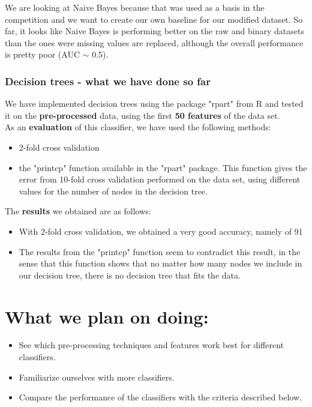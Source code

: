 \documentclass[a4paper,11pt]{article}
\begin{document}
We are looking at Naive Bayes because that was used as a basis in the competition and we want to create our own baseline for our modified dataset. So far, it looks like Naive Bayes is performing better on the raw and binary datasets than the ones were missing values are replaced, although the overall performance is pretty poor (AUC $\sim$ 0.5).


\subsubsection*{Decision trees - what we have done so far}
	We have implemented decision trees using the package "rpart" from R and tested it on the \textbf{pre-processed} data, using the first \textbf{50 features} of the data set. \\
	As an \textbf{evaluation} of this classifier, we have used the following methods:
	\begin{itemize}
		\item 2-fold cross validation
		\item the "printcp" function available in the "rpart" package. This function gives the error from 10-fold cross validation performed on the data set, using different values for the number of nodes in the decision tree. 
	\end{itemize}
	The \textbf{results} we obtained are as follows:
	\begin{itemize}
		\item With 2-fold cross validation, we obtained a very good accuracy, namely of 91%
		\item The results from the "printcp" function seem to contradict this result, in the sense that this function shows that no matter how many nodes we include in our decision tree, there is no decision tree that fits the data.
	\end{itemize}
	
	
	
	

\section*{What we plan on doing:}
\begin{itemize}
	\item See which pre-processing techniques and features work best for different classifiers.
	\item Familiarize ourselves with more classifiers.
	\item Compare the performance of the classifiers with the criteria described below.
\end{itemize}
\end{document}
